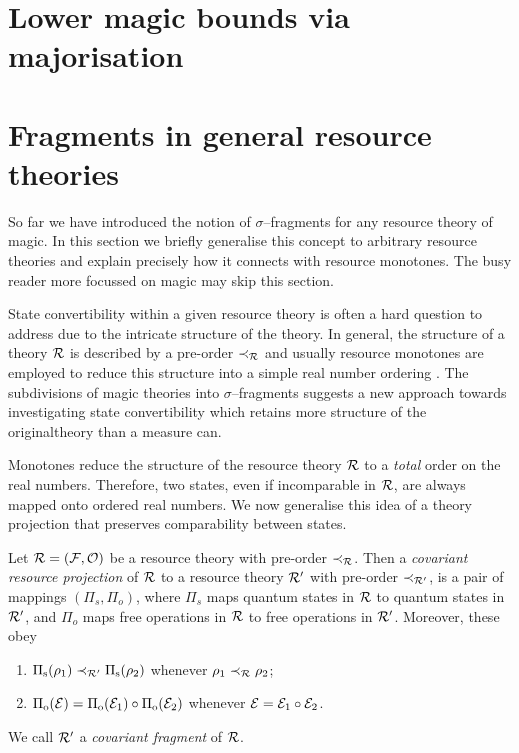 \documentclass[pra,
aps,
twocolumn,
superscriptaddress,
groupedaddress,
nofootinbib,
reprint
]{revtex4-1}
\begin{document}

\section{Lower magic bounds via majorisation}
\label{sec:lower_bounds}



\section{Fragments in general resource theories}
\label{sec:general_resources}


So far we have introduced the notion of $\sigma$--fragments for any resource theory of magic. 
In this section we briefly generalise this concept to arbitrary resource theories and explain precisely how it connects with resource monotones. 
The busy reader more focussed on magic may skip this section.

State convertibility within a given resource theory is often a hard question to address due to the intricate structure of the theory.
In general, the structure of a theory $\mathcal{R}$ is described by a pre-order $\prec_{\mathcal{R}}$ and usually resource monotones are employed to reduce this structure into a simple real number ordering .
The subdivisions of magic theories into $\sigma$--fragments suggests a new approach towards investigating state convertibility which retains more structure of the originaltheory than a measure can.

Monotones reduce the structure of the resource theory $\mathcal{R}$ to a \emph{total} order on the real numbers.
Therefore, two states, even if incomparable in $\mathcal{R}$, are always mapped onto ordered real numbers.
We now generalise this idea of a theory projection that preserves comparability between states. 
\begin{definition}\label{def:covproj}
Let $\mathcal{R} = (\mathcal{F}, \mathcal{O})$ be a resource theory with pre-order $\prec_{\mathcal{R}}$. 
Then a \emph{covariant resource projection} of $\mathcal{R}$ to a resource theory $\mathcal{R}'$ with pre-order $\prec_{\mathcal{R}'}$, is a pair of mappings $(\Pi_s, \Pi_o)$, where $\Pi_s$ maps quantum states in $\mathcal{R}$ to quantum states in $\mathcal{R}'$, and $\Pi_o$ maps free operations in $\mathcal{R}$ to free operations in $\mathcal{R}'$. 
Moreover, these obey
	\begin{enumerate}
        \item $\Pi_{\rm{s}}(\rho_1) \prec_{\mathcal{R}'} \Pi_{\rm{s}}(\rho_2)$ whenever $\rho_1 \prec_{\mathcal{R}} \rho_2$;
        \item $\Pi_{\rm{o}}(\mathcal{E}) = \Pi_{\rm{o}}(\mathcal{E}_1) \circ \Pi_{\rm{o}}(\mathcal{E}_2)$ whenever $\mathcal{E} = \mathcal{E}_1 \circ \mathcal{E}_2$.
    \end{enumerate}
We call $\mathcal{R}'$ a \emph{covariant fragment} of $\mathcal{R}$.
\end{definition}
\end{document}
